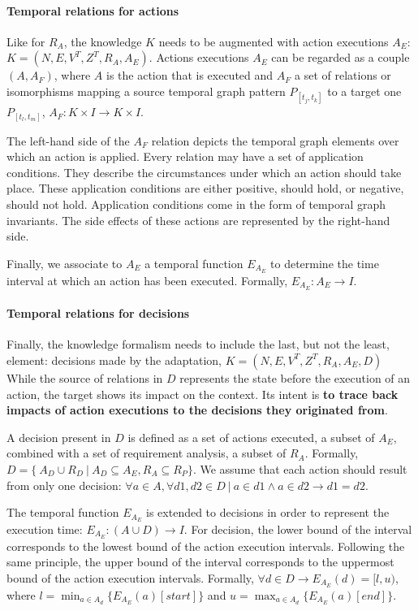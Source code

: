 \paragraph{Temporal relations for actions}
Like for $R_A$, the knowledge $K$ needs to be augmented with action executions $A_E$: $K = (N, E, V^T, Z^T, R_A, A_E)$.
Actions executions $A_E$ can be regarded as a couple $(A, A_F)$, where $A$ is the action that is executed and $A_F$ a set of relations or isomorphisms mapping a source temporal graph pattern $P_{[t_j, t_k]}$ to a target one $P_{[t_l, t_m]}$,  $A_F : K \times I \rightarrow K \times I$.

The left-hand side of the $A_F$ relation depicts the temporal graph elements over which an action is applied.
Every relation may have a set of application conditions. 
They describe the circumstances under which an action should take place. 
These application conditions are either positive, should hold, or negative, should not hold. 
Application conditions come in the form of temporal graph invariants.  
The side effects of these actions are represented by the right-hand side. 

Finally, we associate to $A_E$ a temporal function $E_{A_E}$ to determine the time interval at which an action has been executed. 
Formally, $E_{A_E}: A_E \rightarrow I$.

\paragraph{Temporal relations for decisions}
Finally, the knowledge formalism needs to include the last, but not the least, element: decisions made by the adaptation, $K = (N, E, V^T, Z^T, R_A, A_E, D)$
While the source of relations in $D$ represents the state before the execution of an action, the target shows its impact on the \gls{context}. 
Its intent is \textbf{to trace back impacts of action executions to the decisions they originated from}.  

A decision present in ${D}$ is defined as a set of actions executed, \ie a subset of ${A_E}$, combined with a set of requirement analysis, \ie a subset of ${R_A}$.
Formally, ${D} = \{\ {A_D \cup R_D}~|~{A_D}  \subseteq A_E, R_A \subseteq R_P\}$.
We assume that each action should result from only one decision: $\forall a \in {A}, \forall d1, d2 \in {D}~|~a \in d1 \wedge a \in d2 \rightarrow d1 = d2$.

The temporal function $E_{A_E}$ is extended to decisions in order to represent the execution time: $E_{A_E}: (A \cup D) \rightarrow I$.
For decision, the lower bound of the interval corresponds to the lowest bound of the action execution intervals.
Following the same principle, the upper bound of the interval corresponds to the uppermost bound of the action execution intervals.
Formally, $\forall d \in D \rightarrow E_{A_E}(d) = [l,u)$, where $l = \displaystyle \min_{a \in A_d} \{E_{A_E}(a)[start]\}$ and $u = \displaystyle \max_{a \in A_d} \{E_{A_E}(a)[end]\}$.

